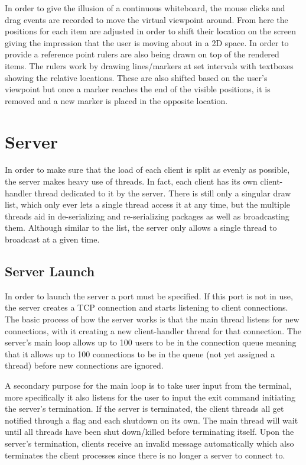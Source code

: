 \documentclass[12pt, a4paper]{report}
\begin{document}
In order to give the illusion of a continuous whiteboard, the mouse clicks and drag events are recorded to move the virtual viewpoint around. From here the positions for each item are adjusted in order to shift their location on the screen giving the impression that the user is moving about in a 2D space. In order to provide a reference point rulers are also being drawn on top of the rendered items. The rulers work by drawing lines/markers at set intervals with textboxes showing the relative locations. These are also shifted based on the user's viewpoint but once a marker reaches the end of the visible positions, it is removed and a new marker is placed in the opposite location.






\chapter{Server}
In order to make sure that the load of each client is split as evenly as possible, the server makes heavy use of threads. In fact, each client has its own client-handler thread dedicated to it by the server. There is still only a singular draw list, which only ever lets a single thread access it at any time, but the multiple threads aid in de-serializing and re-serializing packages as well as broadcasting them. Although similar to the list, the server only allows a single thread to broadcast at a given time.

\section{Server Launch}
In order to launch the server a port must be specified. If this port is not in use, the server creates a TCP connection and starts listening to client connections. The basic process of how the server works is that the main thread listens for new connections, with it creating a new client-handler thread for that connection. The server's main loop allows up to 100 users to be in the connection queue meaning that it allows up to 100 connections to be in the queue (not yet assigned a thread) before new connections are ignored.

A secondary purpose for the main loop is to take user input from the terminal, more specifically it also listens for the user to input the exit command initiating the server's termination. If the server is terminated, the client threads all get notified through a flag and each shutdown on its own. The main thread will wait until all threads have been shut down/killed before terminating itself. Upon the server's termination, clients receive an invalid message automatically which also terminates the client processes since there is no longer a server to connect to.
\end{document}
